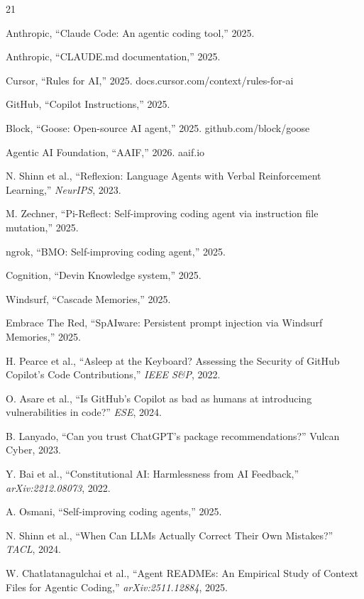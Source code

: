 \documentclass[conference,10pt]{IEEEtran}
\begin{document}
\begin{thebibliography}{21}

 Anthropic, ``Claude Code: An agentic coding tool,'' 2025.

 Anthropic, ``CLAUDE.md documentation,'' 2025.

 Cursor, ``Rules for AI,'' 2025. docs.cursor.com/context/rules-for-ai

 GitHub, ``Copilot Instructions,'' 2025.

 Block, ``Goose: Open-source AI agent,'' 2025. github.com/block/goose

 Agentic AI Foundation, ``AAIF,'' 2026. aaif.io

 N. Shinn et al., ``Reflexion: Language Agents with Verbal Reinforcement Learning,'' \textit{NeurIPS}, 2023.

 M. Zechner, ``Pi-Reflect: Self-improving coding agent via instruction file mutation,'' 2025.

 ngrok, ``BMO: Self-improving coding agent,'' 2025.

 Cognition, ``Devin Knowledge system,'' 2025.

 Windsurf, ``Cascade Memories,'' 2025.

 Embrace The Red, ``SpAIware: Persistent prompt injection via Windsurf Memories,'' 2025.

 H. Pearce et al., ``Asleep at the Keyboard? Assessing the Security of GitHub Copilot's Code Contributions,'' \textit{IEEE S\&P}, 2022.

 O. Asare et al., ``Is GitHub's Copilot as bad as humans at introducing vulnerabilities in code?'' \textit{ESE}, 2024.

 B. Lanyado, ``Can you trust ChatGPT's package recommendations?'' Vulcan Cyber, 2023.

 Y. Bai et al., ``Constitutional AI: Harmlessness from AI Feedback,'' \textit{arXiv:2212.08073}, 2022.

 A. Osmani, ``Self-improving coding agents,'' 2025.

 N. Shinn et al., ``When Can LLMs Actually Correct Their Own Mistakes?'' \textit{TACL}, 2024.

 W. Chatlatanagulchai et al., ``Agent READMEs: An Empirical Study of Context Files for Agentic Coding,'' \textit{arXiv:2511.12884}, 2025.


\end{thebibliography}
\end{document}
